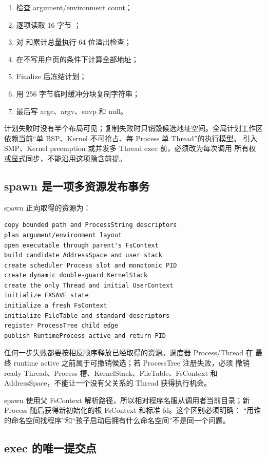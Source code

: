\begin{enumerate}
  \item 检查 argument/environment count；
  \item 逐项读取 16 字节 ；
  \item 对  和累计总量执行 64 位溢出检查；
  \item 在不写用户页的条件下计算全部地址；
  \item Finalize 后冻结计划；
  \item 用 256 字节临时缓冲分块复制字符串；
  \item 最后写 argc、argv、envp 和 null。
\end{enumerate}

计划失败时没有半个布局可见；复制失败时只销毁候选地址空间。全局计划工作区
依赖当前“单 BSP、Kernel 不可抢占、每 Process 单 Thread”的执行模型。
引入 SMP、Kernel preemption 或并发多 Thread exec 前，必须改为每次调用
所有权或显式同步，不能沿用这项隐含前提。

\subsection{spawn 是一项多资源发布事务}

spawn 正向取得的资源为：

\begin{lstlisting}[caption={spawn 的正向所有权链}]
copy bounded path and ProcessString descriptors
plan argument/environment layout
open executable through parent's FsContext
build candidate AddressSpace and user stack
create scheduler Process slot and monotonic PID
create dynamic double-guard KernelStack
create the only Thread and initial UserContext
initialize FXSAVE state
initialize a fresh FsContext
initialize FileTable and standard descriptors
register ProcessTree child edge
publish RuntimeProcess active and return PID
\end{lstlisting}

任何一步失败都要按相反顺序释放已经取得的资源。调度器 Process/Thread 在
最终 runtime active 之前属于可撤销候选；若 ProcessTree 注册失败，必须
撤销 ready Thread、Process 槽、KernelStack、FileTable、FsContext 和
AddressSpace，不能让一个没有父关系的 Thread 获得执行机会。

spawn 使用父 FsContext 解析路径，所以相对程序名服从调用者当前目录；新
Process 随后获得新初始化的根 FsContext 和标准 fd。这个区别必须明确：
“用谁的命名空间找程序”和“孩子启动后拥有什么命名空间”不是同一个问题。

\subsection{exec 的唯一提交点}

